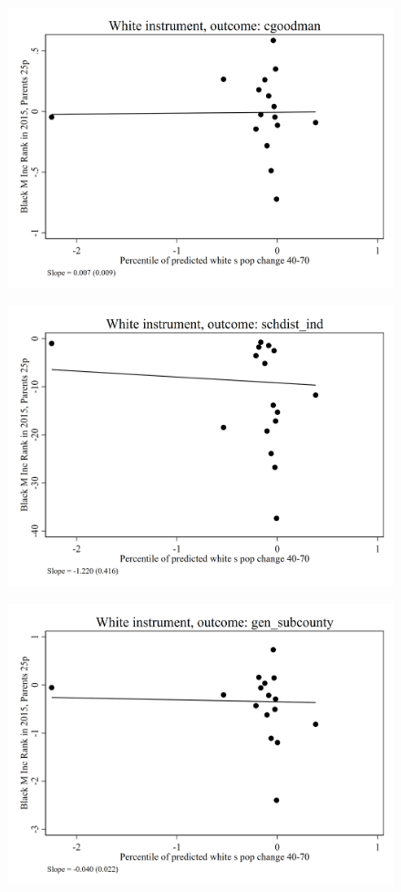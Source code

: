 \documentclass{article}
\begin{document}
\clearpage
\begin{figure}
	\centering
	\includegraphics[width=.8\textwidth]{figures/exogeneity_tests/D14_cgoodman.png}
\end{figure}
\clearpage
\begin{figure}
	\centering
	\includegraphics[width=.8\textwidth]{figures/exogeneity_tests/D14_schdist_ind.png}
\end{figure}
\clearpage
\begin{figure}
	\centering
	\includegraphics[width=.8\textwidth]{figures/exogeneity_tests/D14_gen_subcounty.png}
\end{figure}
\end{document}
